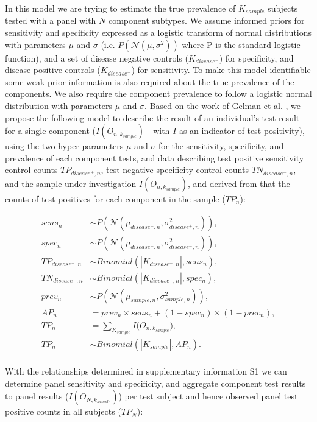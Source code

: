 \documentclass[a4paper, 12pt, twoside]{article}
\begin{document}
In this model we are trying to estimate the true prevalence of \(K_{sample}\) subjects tested with a panel with \(N\) component subtypes. We assume informed priors for sensitivity and specificity expressed as a logistic transform of normal distributions with parameters \(\mu\) and \(\sigma\) (i.e. \(P(\mathcal{N}(\mu,\sigma^2))\) where P is the standard logistic function), and a set of disease negative controls (\(K_{disease^-}\)) for specificity, and disease positive controls (\(K_{disease^+}\)) for sensitivity. To make this model identifiable some weak prior information is also required about the true prevalence of the components. We also require the component prevalence to follow a logistic normal distribution with parameters \(\mu\) and \(\sigma\). Based on the work of Gelman et al. \cite{gelman2020}, we propose the following model to describe the result of an individual's test result for a single component (\(I(O_{n,k_{sample}})\) - with \(I\) as an indicator of test positivity), using the two hyper-parameters \(\mu\) and \(\sigma\) for the sensitivity, specificity, and prevalence of each component tests, and data describing test positive sensitivity control counts \(TP_{disease^+,n}\), test negative specificity control counts \(TN_{disease^-,n}\), and the sample under investigation \(I(O_{n,k_{sample}})\), and derived from that the counts of test positives for each component in the sample (\(TP_n\)):

\begin{equation*}
\begin{aligned}
sens_n &\sim P(\mathcal{N}(\mu_{disease^+,n}, \sigma_{disease^+,n}^2)), \\
spec_n &\sim P(\mathcal{N}(\mu_{disease^-,n}, \sigma_{disease^-,n}^2)), \\
TP_{disease^+,n} &\sim Binomial(|K_{disease^+,n}|, sens_n), \\
TN_{disease^-,n} &\sim Binomial(|K_{disease^-,n}|, spec_n), \\
prev_n &\sim P(\mathcal{N}(\mu_{sample,n}, \sigma_{sample,n}^2)), \\
AP_n &= prev_n \times sens_n + (1-spec_n) \times (1-prev_n), \\
TP_n &= \sum_{K_{sample}}{I(O_{n,k_{sample}}}), \\
TP_n &\sim Binomial(|K_{sample}|, AP_n). \\
\end{aligned}
\end{equation*}

With the relationships determined in supplementary information S1 we can determine panel sensitivity and specificity, and aggregate component test results to panel results (\(I(O_{N,k_{sample}})\)) per test subject and hence observed panel test positive counts in all subjects (\(TP_N\)):
\end{document}
